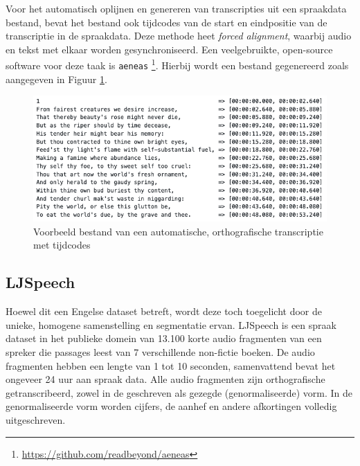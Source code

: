 Voor het automatisch oplijnen en genereren van transcripties uit een spraakdata bestand, bevat het bestand ook tijdcodes van de start en eindpositie van de transcriptie in de spraakdata. Deze methode heet \textit{forced alignment}, waarbij audio en tekst met elkaar worden gesynchroniseerd. Een veelgebruikte, open-source software voor deze taak is \texttt{aeneas} \footnote{\url{https://github.com/readbeyond/aeneas}}. Hierbij wordt een bestand gegenereerd zoals aangegeven in Figuur \ref{fig:aenas}. 

\begin{table}[]
    \centering
    \caption{Kolommen van een orthografisch transcriptie bestand}
    \label{tab:orthografische_file}
\end{table}

\begin{figure}
    \centering
    \includegraphics[width=\textwidth]{figures/transcription.png}
    \caption{Voorbeeld bestand van een automatische, orthografische transcriptie met tijdcodes}
    \label{fig:aenas}
\end{figure}


\subsection{LJSpeech}
Hoewel dit een Engelse dataset betreft, wordt deze toch toegelicht door de unieke, homogene samenstelling en segmentatie ervan. LJSpeech is een spraak dataset in het publieke domein van 13.100 korte audio fragmenten van een spreker die passages leest van 7 verschillende non-fictie boeken. De audio fragmenten hebben een lengte van 1 tot 10 seconden, samenvattend bevat het ongeveer 24 uur aan spraak data. Alle audio fragmenten zijn orthografische getranscribeerd, zowel in de geschreven als gezegde (genormaliseerde) vorm. In de genormaliseerde vorm worden cijfers, de aanhef en andere afkortingen volledig uitgeschreven.

